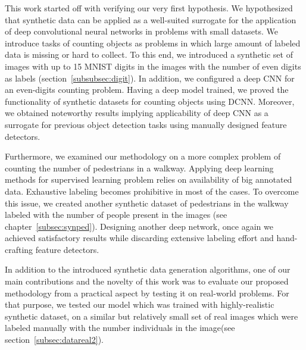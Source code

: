 This work started off with verifying our very first hypothesis. We hypothesized that synthetic data can be applied as a well-suited surrogate for the application of deep convolutional neural networks in problems with small datasets. We introduce tasks of counting objects as problems in which large amount of labeled data is missing or hard to collect. To this end, we introduced a synthetic set of images with up to 15 MNIST digits in the images with the number of even digits as labels (section~\ref{subsubsec:digit}). In addition, we configured a deep CNN for an even-digits counting problem. Having a deep model trained, we proved the functionality of synthetic datasets for counting objects using DCNN. Moreover, we obtained noteworthy results implying applicability of deep CNN as a surrogate for previous object detection tasks using manually designed feature detectors.


   

\indent Furthermore, we examined our methodology on a more complex problem of counting the number of pedestrians in a walkway. Applying deep learning methods for supervised learning problem relies on availability of big annotated data. Exhaustive labeling becomes prohibitive in most of the cases. To overcome this issue, we created another synthetic dataset of pedestrians in the walkway labeled with the number of people present in the images (see chapter~\ref{subsec:synped}). Designing another deep network, once again we achieved satisfactory results while discarding extensive labeling effort and hand-crafting feature detectors.   

\indent In addition to the introduced synthetic data generation algorithms, one of our main contributions and the novelty of this work was to evaluate our proposed methodology from a practical aspect by testing it on real-world problems. For that purpose, we tested our model which was trained with highly-realistic synthetic dataset, on a similar but relatively small set of real images which were labeled manually with the number individuals in the image(see section~\ref{subsec:datareal2}).    


